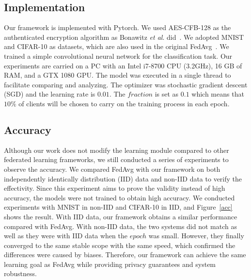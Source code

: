\subsection{Implementation}
Our framework is implemented with Pytorch. We used AES-CFB-128 as the authenticated encryption algorithm as Bonawitz \emph{et al}. did~\cite{Practical}. We adopted MNIST and CIFAR-10 as datasets, which are also used in the original FedAvg~\cite{mcmahan2016communicationefficient}. We trained a simple convolutional neural network for the classification task. Our experiments are carried on a PC with an Intel i7-8700 CPU (3.2GHz), 16 GB of RAM, and a GTX 1080 GPU. The model was executed in a single thread to facilitate comparing and analyzing. The optimizer was stochastic gradient descent (SGD) and the learning rate is $0.01$. The $fraction$ is set as $0.1$ which means that $10\%$ of clients will be chosen to carry on the training process in each epoch. 

\subsection{Accuracy}
Although our work does not modify the learning module compared to other federated learning frameworks, we still conducted a series of experiments to observe the accuracy. We compared FedAvg with our framework on both independently identically distribution (IID) data and non-IID data to verify the effectivity. Since this experiment aims to prove the validity instead of high accuracy, the models were not trained to obtain high accuracy. We conducted experiments with MNIST in non-IID and CIFAR-10 in IID, and Figure~\ref{acc} shows the result. With IID data, our framework obtains a similar performance compared with FedAvg. With non-IID data, the two systems did not match as well as they were with IID data when the $epoch$ was small. However, they finally converged to the same stable scope with the same speed, which confirmed the differences were caused by biases. Therefore, our framework can achieve the same learning goal as FedAvg while providing privacy guarantees and system robustness.

